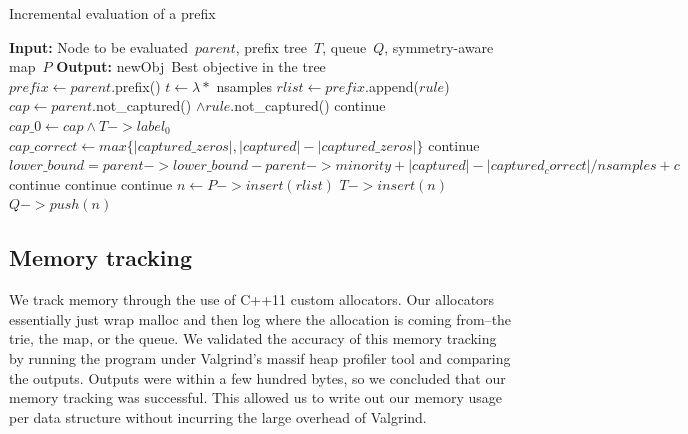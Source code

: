 \begin{algorithm}[t!]
  \caption{Incremental evaluation of a prefix}
\label{alg:incremental}
\begin{algorithmic}
\normalsize
\State \textbf{Input:} Node to be evaluated~$parent$,
prefix tree~$T$,
queue~$Q$,
symmetry-aware map~$P$
\State \textbf{Output:} newObj~Best objective in the tree\\
\State $prefix \gets parent$.prefix()
\State $t \gets \lambda *$ nsamples 
	\State $rlist \gets prefix$.append($rule$)
	\State $cap \gets parent$.not\_captured() $\wedge rule$.not\_captured()
	 
		\State continue
	\EndIf
	\State $cap\_0 \gets cap \wedge T->label_0$ 
	\State $cap\_correct \gets max\{|captured\_zeros|, |captured| - |captured\_zeros|\}$
	 
		\State continue
	\EndIf
	\State $lower\_bound = parent->lower\_bound - parent->minority + |captured| - |captured_correct| / nsamples + c$
	 
		\State continue
	\EndIf
	 
		\State continue
	\EndIf
	 
		\State continue
	\EndIf
	\State $n \gets P->insert(rlist)$ 
		\State $T->insert(n)$
		\State $Q->push(n)$
	\EndIf
\EndFor
\end{algorithmic}
\end{algorithm}

\subsection{Memory tracking}
We track memory through the use of C++11 custom allocators.
Our allocators essentially just wrap malloc and then log where the allocation is coming from--the trie, the map, or the queue.
We validated the accuracy of this memory tracking by running the program under Valgrind's massif heap profiler tool and comparing the outputs.
Outputs were within a few hundred bytes, so we concluded that our memory tracking was successful.
This allowed us to write out our memory usage per data structure without incurring the large overhead of Valgrind.